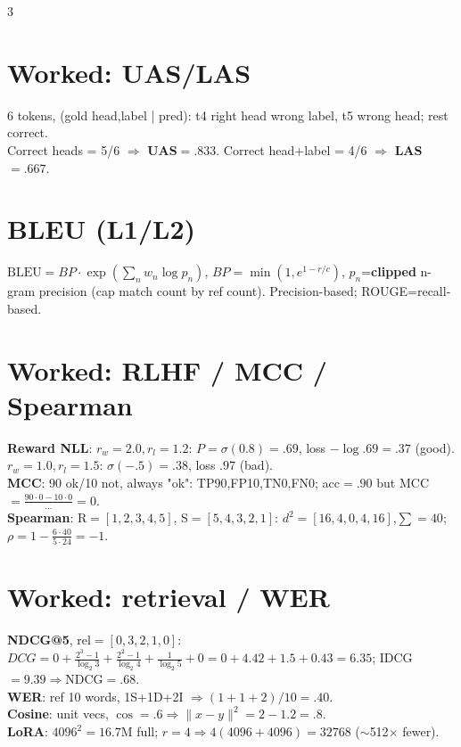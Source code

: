 \documentclass[12pt]{extarticle} %
\newcommand{\sub}[1]{\textcolor{key}{\textbf{#1}}}
\begin{document}
\begin{multicols}{3}
\section{Worked: UAS/LAS}
6 tokens, (gold head,label | pred): t4 right head wrong label, t5 wrong head; rest correct.\\
Correct heads = 5/6 $\Rightarrow$ \sub{UAS}$=.833$. Correct head+label = 4/6 $\Rightarrow$ \sub{LAS}$=.667$.

\section{BLEU \textnormal{(L1/L2)}}
$\text{BLEU}=BP\cdot\exp(\sum_n w_n\log p_n)$, $BP=\min(1,e^{1-r/c})$, $p_n$=\sub{clipped} n-gram precision (cap match count by ref count). Precision-based; ROUGE=recall-based.

\section{Worked: RLHF / MCC / Spearman}
\sub{Reward NLL}: $r_w{=}2.0,r_l{=}1.2$: $P{=}\sigma(0.8){=}.69$, loss $-\log.69{=}.37$ (good). $r_w{=}1.0,r_l{=}1.5$: $\sigma(-.5){=}.38$, loss $.97$ (bad).\\
\sub{MCC}: 90 ok/10 not, always "ok": TP90,FP10,TN0,FN0; acc$=.90$ but MCC$=\tfrac{90\cdot0-10\cdot0}{\dots}=0$.\\
\sub{Spearman}: R$=[1,2,3,4,5]$, S$=[5,4,3,2,1]$: $d^2=[16,4,0,4,16]$,$\sum{=}40$; $\rho{=}1-\tfrac{6\cdot40}{5\cdot24}{=}-1$.

\section{Worked: retrieval / WER}
\sub{NDCG@5}, rel$=[0,3,2,1,0]$: $DCG=0+\tfrac{2^3-1}{\log_2 3}+\tfrac{2^2-1}{\log_2 4}+\tfrac{1}{\log_2 5}+0=0+4.42+1.5+0.43=6.35$; IDCG$=9.39\Rightarrow$NDCG$=.68$.\\
\sub{WER}: ref 10 words, 1S+1D+2I $\Rightarrow (1{+}1{+}2)/10=.40$.\\
\sub{Cosine}: unit vecs, $\cos{=}.6\Rightarrow\|x{-}y\|^2{=}2{-}1.2{=}.8$.\\
\sub{LoRA}: $4096^2{=}16.7$M full; $r{=}4\Rightarrow4(4096{+}4096){=}32768$ ($\sim$512$\times$ fewer).


\end{multicols}
\end{document}
